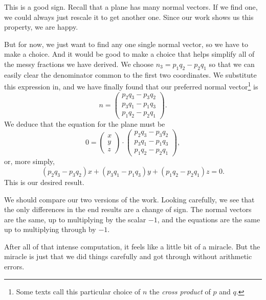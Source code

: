 \documentclass[00-livre-main.tex]{subfiles}
\begin{document}
This is a good sign. Recall that a plane has many normal vectors. If we find one, we could always just rescale it to get another one. Since our work shows us this property, we are happy. 

But for now, we just want to find any one single normal vector, so we have to make a choice. And it would be good to make a choice that helps simplify all of the messy fractions we have derived. We choose $n_3 = p_1q_2 - p_2q_1$ so that we can easily clear the denominator common to the first two coordinates. We substitute this expression in, and we have finally found that our preferred normal vector\footnote{Some texts call this particular choice of $n$ the \emph{cross product} of $p$ and $q$.} is
\[
n = \begin{pmatrix} p_2 q_3 - p_3 q_2 \\
p_3 q_1 - p_1 q_3 \\ p_1 q_2 - p_2 q_1 \end{pmatrix}.
\]
We deduce that the equation for the plane must be
\[
0 = \begin{pmatrix}x \\ y \\ z \end{pmatrix} \cdot \begin{pmatrix} p_2 q_3 - p_3 q_2 \\
p_3 q_1 - p_1 q_3 \\ p_1 q_2 - p_2 q_1 \end{pmatrix},
\]
or, more simply, 
\[
(p_2 q_3 - p_3 q_2) x +
(p_3 q_1 - p_1 q_3) y +
(p_1 q_2 - p_2 q_1) z = 0.
\]
This is our desired result.

We should compare our two versions of the work. Looking carefully, we see that the only differences in the end results are a change of sign. The normal vectors are the same, up to multiplying by the scalar $-1$, and the equations are the same up to multiplying through by $-1$.

After all of that intense computation, it feels like a little bit of a miracle. But the miracle is just that we did things carefully and got through without arithmetic errors.
\end{document}
